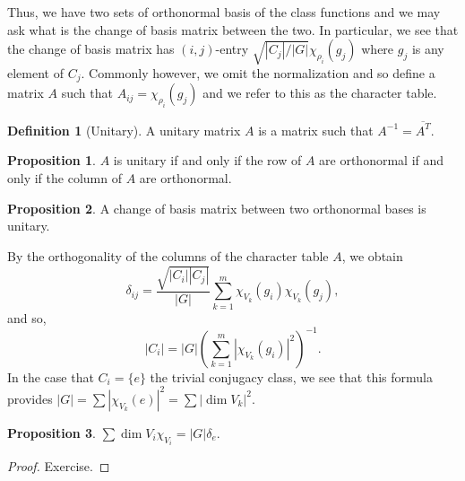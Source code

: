 \documentclass[]{article}
\theoremstyle{definition}
\theoremstyle{definition}
\newtheorem{definition}{Definition}[section]
\newtheorem{proposition}{Proposition}[section]
\begin{document}
Thus, we have two sets of orthonormal basis of the class functions and we may 
ask what is the change of basis matrix between the two. In particular, we 
see that the change of basis matrix has \((i, j)\)-entry 
\(\sqrt{|C_j| / |G|}\chi_{\rho_i}(g_j)\) where \(g_j\) is any element of 
\(C_j\). Commonly however, we omit the normalization and so define 
a matrix \(A\) such that \(A_{ij} = \chi_{\rho_i}(g_j)\) and we refer to this 
as the character table.

\begin{definition}[Unitary]
  A unitary matrix \(A\) is a matrix such that \(A^{-1} = \overline{A^T}\).
\end{definition}

\begin{proposition}
  \(A\) is unitary if and only if the row of \(A\) are orthonormal if and only 
  if the column of \(A\) are orthonormal.
\end{proposition}

\begin{proposition}
  A change of basis matrix between two orthonormal bases is unitary.
\end{proposition}

By the orthogonality of the columns of the character table \(A\), we obtain 
\[\delta_{ij} = \frac{\sqrt{|C_i||C_j|}}{|G|}\sum_{k = 1}^m 
  \chi_{V_k}(g_i)\chi_{V_k}(g_j),\]
and so, 
\[|C_i| = |G| \left(\sum_{k = 1}^m |\chi_{V_k}(g_i)|^2\right)^{-1}.\]
In the case that \(C_i = \{e\}\) the trivial conjugacy class, we see that 
this formula provides \(|G| = \sum |\chi_{V_k}(e)|^2 = \sum |\dim V_k|^2\). 

\begin{proposition}
  \(\sum \dim V_i \chi_{V_i} = |G| \delta_{e}\).
\end{proposition}
\begin{proof}
  Exercise.
\end{proof}
\end{document}
